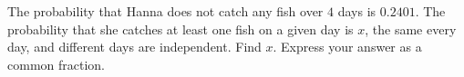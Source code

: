 The probability that Hanna does not catch any fish over $4$ days is $0.2401$. The probability that she catches at least one fish on a given day is $x$, the same every day, and different days are independent. Find $x$. Express your answer as a common fraction.

